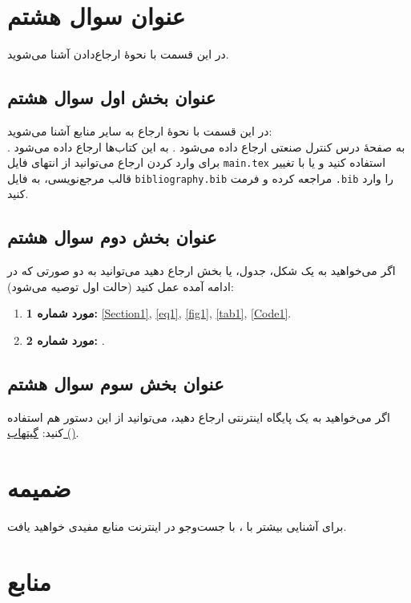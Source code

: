 \documentclass{article}
\begin{document}
\section{عنوان سوال هشتم}
در این قسمت با نحوۀ ارجاع‌دادن آشنا می‌شوید.
\subsection{عنوان بخش اول سوال هشتم}
در این قسمت با نحوۀ ارجاع به سایر منابع آشنا می‌شوید:\\
\indent
به صفحۀ درس کنترل صنعتی ارجاع داده می‌شود \cite{b1}. 
به این کتاب‌ها ارجاع داده می‌شود \cite{b2}\cite{b3}.
برای وارد کردن ارجاع می‌توانید از انتهای فایل 
\verb|main.tex|
استفاده کنید و یا با تغییر قالب مرجع‌نویسی،
به فایل
\verb|bibliography.bib|
مراجعه کرده و فرمت
\verb|.bib|
را وارد کنید.
\subsection{عنوان بخش دوم سوال هشتم}
اگر می‌خواهید به یک شکل، جدول، یا بخش ارجاع دهید می‌توانید به دو صورتی که در ادامه آمده عمل کنید (حالت اول توصیه می‌شود):
\begin{enumerate}
    \item \textbf{مورد شماره 1:} \autoref{Section1}, \autoref{eq1}, \autoref{fig1}, \autoref{tab1}, \autoref{Code1}.
    \item \textbf{مورد شماره 2:} .
\end{enumerate}
\subsection{عنوان بخش سوم سوال هشتم}
اگر می‌خواهید به یک پایگاه اینترنتی ارجاع دهید، می‌توانید از این دستور هم استفاده کنید:
\href{https://github.com/MJAHMADEE/ARASLaTeXFormats}{گیتهاب ()}.

\section{ضمیمه}
برای آشنایی بیشتر با \lr{\LaTeX}، با جست‌و‌جو در اینترنت منابع مفیدی خواهید یافت.


\section*{منابع}
\end{document}
